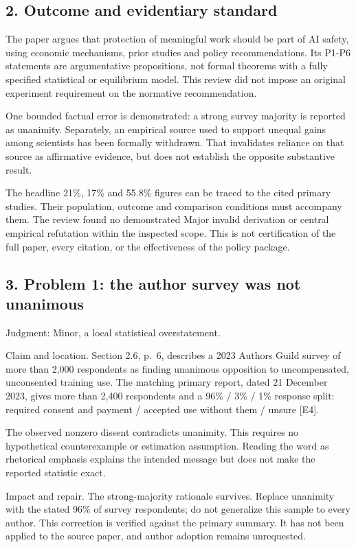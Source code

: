 \documentclass[10pt]{article}
\begin{document}
\subsection*{2. Outcome and evidentiary standard}
The paper argues that protection of meaningful work should be part of AI safety, using economic mechanisms, prior studies and policy recommendations. Its P1-P6 statements are argumentative propositions, not formal theorems with a fully specified statistical or equilibrium model. This review did not impose an original experiment requirement on the normative recommendation.\par
One bounded factual error is demonstrated: a strong survey majority is reported as unanimity. Separately, an empirical source used to support unequal gains among scientists has been formally withdrawn. That invalidates reliance on that source as affirmative evidence, but does not establish the opposite substantive result.\par
The headline 21\%, 17\% and 55.8\% figures can be traced to the cited primary studies. Their population, outcome and comparison conditions must accompany them. The review found no demonstrated Major invalid derivation or central empirical refutation within the inspected scope. This is not certification of the full paper, every citation, or the effectiveness of the policy package.\par
\subsection*{3. Problem 1: the author survey was not unanimous}
Judgment: Minor, a local statistical overstatement.\par
Claim and location. Section 2.6, p. 6, describes a 2023 Authors Guild survey of more than 2,000 respondents as finding unanimous opposition to uncompensated, unconsented training use. The matching primary report, dated 21 December 2023, gives more than 2,400 respondents and a 96\% / 3\% / 1\% response split: required consent and payment / accepted use without them / unsure [E4].\par
The observed nonzero dissent contradicts unanimity. This requires no hypothetical counterexample or estimation assumption. Reading the word as rhetorical emphasis explains the intended message but does not make the reported statistic exact.\par
Impact and repair. The strong-majority rationale survives. Replace unanimity with the stated 96\% of survey respondents; do not generalize this sample to every author. This correction is verified against the primary summary. It has not been applied to the source paper, and author adoption remains unrequested.\par
\end{document}
